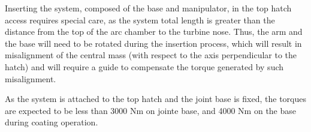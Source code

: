
Inserting the system, composed of the base and manipulator, in the top
hatch access requires special care, as the system total length is greater
than the distance from the top of the arc chamber to the turbine nose. Thus,
the arm and the base will need to be rotated during the insertion process,
which will result in misalignment of the central mass (with respect to the axis
perpendicular to the hatch) and will require a guide to compensate the torque
generated by such misalignment.



As the system is attached to the top hatch and the joint base is fixed,
the torques are expected to be less than 3000 Nm on jointe base, and 4000 Nm on
the base during coating operation.



